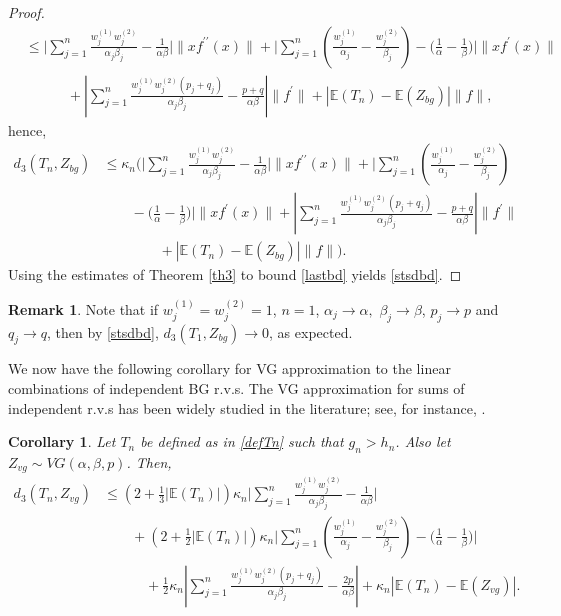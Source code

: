 \documentclass[12pt, a4paper,reqno]{amsart}
\newtheorem{cor}[thm]{Corollary}
\theoremstyle{definition}
\theoremstyle{myremark}
\newtheorem{rem}[thm]{Remark}
\numberwithin{equation}{section}
\begin{document}
\begin{proof}
\begin{align}
\nonumber& \leq \bigg|\sum_{j=1}^{n}\frac{w_{j}^{(1)}w_{j}^{(2)} }{\alpha_j \beta_j}- \frac{1}{\alpha \beta}\bigg|\|xf^{\prime\prime}(x)\|+\bigg| \sum_{j=1}^{n}\left(\frac{w_{j}^{(1)} }{\alpha_j}-\frac{w_{j}^{(2)}}{\beta_j} \right)  -\bigg(\frac{1}{\alpha}-\frac{1}{\beta}\bigg) \bigg|\|xf^{\prime}(x)\|\\
\nonumber &\quad\quad\quad+\left| \sum_{j=1}^{n}\frac{w_{j}^{(1)}w_{j}^{(2)}(p_j+q_j)}{\alpha_j \beta_j} -\frac{p+ q}{\alpha \beta} \right|\|f^{\prime}\|+\left|\mathbb{E}(T_n) -\mathbb{E}(Z_{bg}) \right|\|f\|,
\end{align}
\noindent
hence,
\begin{align}\label{lastbd}
\nonumber d_3(T_n,Z_{bg})&\leq \kappa_n \bigg(\bigg|\sum_{j=1}^{n}\frac{w_{j}^{(1)}w_{j}^{(2)} }{\alpha_j \beta_j}- \frac{1}{\alpha \beta}\bigg|\|xf^{\prime\prime}(x)\|+\bigg| \sum_{j=1}^{n}\left(\frac{w_{j}^{(1)} }{\alpha_j}-\frac{w_{j}^{(2)}}{\beta_j} \right) \\
\nonumber&\quad\quad
 -\bigg(\frac{1}{\alpha}-\frac{1}{\beta}\bigg) \bigg|\|xf^{\prime}(x)\|+\left| \sum_{j=1}^{n}\frac{w_{j}^{(1)}w_{j}^{(2)}(p_j+q_j)}{\alpha_j \beta_j} -\frac{p+ q}{\alpha \beta} \right|\|f^{\prime}\|\\
 &\quad\quad\quad\quad+\left|\mathbb{E}(T_n) -\mathbb{E}(Z_{bg}) \right|\|f\|  \bigg).
\end{align}
\noindent
Using the estimates of Theorem \ref{th3} to bound \eqref{lastbd} yields \eqref{stsdbd}.
\end{proof}
\begin{rem}
 Note that if $w_j^{(1)}=w_j^{(2)}=1$, $n=1$, $\alpha_j \to \alpha,$ $\beta_j \to \beta$, $p_j \to p$ and $q_j \to q$, then by \eqref{stsdbd}, $d_3(T_1,Z_{bg}) \to 0$, as expected.
\end{rem}
\vspace{-0.5cm}
\noindent
We now have the following corollary for VG approximation to the linear combinations of independent BG r.v.s. The VG approximation for sums of independent r.v.s has been widely studied in the literature; see, for instance, \cite{Gaunt2014, Gaunt2020, Gaunt2022}.
\vspace{-0.5cm}
\begin{cor}\label{ApproxTHM1}
Let $T_n$ be defined as in \eqref{defTn} such that $g_n> h_n$.
Also let $Z_{vg} \sim VG (\alpha,\beta,p)$. Then,
\begin{align}\label{stsdbdvg}
\nonumber d_{3}(T_n,Z_{vg}) & \leq \left(2+\frac{1}{3}|\mathbb{E}(T_n)|\right)\kappa_n\bigg|\sum_{j=1}^{n}\frac{w_{j}^{(1)}w_{j}^{(2)} }{\alpha_j \beta_j}- \frac{1}{\alpha \beta}\bigg|\\
\nonumber &\quad\quad+\left(2+\frac{1}{2}|\mathbb{E}(T_n)|\right)\kappa_n\bigg| \sum_{j=1}^{n}\left(\frac{w_{j}^{(1)} }{\alpha_j}-\frac{w_{j}^{(2)}}{\beta_j} \right)  -\bigg(\frac{1}{\alpha}-\frac{1}{\beta}\bigg) \bigg|\\
&\quad\quad\quad+\frac{1}{2}\kappa_n\left| \sum_{j=1}^{n}\frac{w_{j}^{(1)}w_{j}^{(2)}(p_j+q_j)}{\alpha_j \beta_j} -\frac{2p}{\alpha \beta} \right|+\kappa_n\left|\mathbb{E}(T_n) -\mathbb{E}(Z_{vg}) \right|.
\end{align}
\end{cor}
\end{document}
